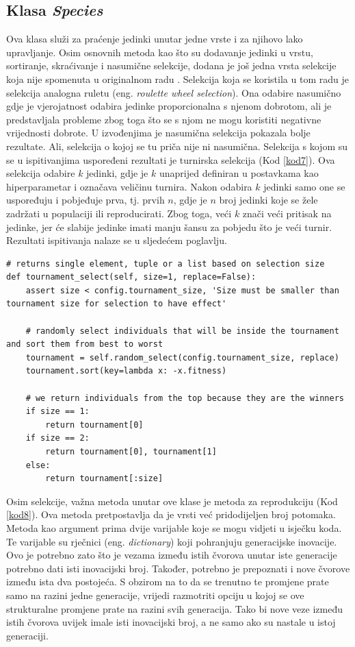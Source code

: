 \documentclass[times, utf8, diplomski, numeric]{fer}
\begin{document}
\subsection{Klasa \textit{Species}}
Ova klasa služi za praćenje jedinki unutar jedne vrste i za njihovo lako upravljanje. Osim osnovnih metoda kao što su dodavanje jedinki u vrstu, sortiranje, skraćivanje i nasumične selekcije, dodana je još jedna vrsta selekcije koja nije spomenuta u originalnom radu \citep{rad5}. Selekcija koja se koristila u tom radu je selekcija analogna ruletu (eng. \textit{roulette wheel selection}). Ona odabire nasumično gdje je vjerojatnost odabira jedinke proporcionalna s njenom dobrotom, ali je predstavljala probleme zbog toga što se s njom ne mogu koristiti negativne vrijednosti dobrote. U izvođenjima je nasumična selekcija pokazala bolje rezultate. Ali, selekcija o kojoj se tu priča nije ni nasumična. Selekcija s kojom su se u ispitivanjima uspoređeni rezultati je turnirska selekcija (Kod \ref{kod7}). Ova selekcija odabire $k$ jedinki, gdje je $k$ unaprijed definiran u postavkama kao hiperparametar i označava veličinu turnira. Nakon odabira $k$ jedinki samo one se uspoređuju i pobjeđuje prva, tj. prvih $n$, gdje je $n$ broj jedinki koje se žele zadržati u populaciji ili reproducirati. Zbog toga, veći $k$ znači veći pritisak na jedinke, jer će slabije jedinke imati manju šansu za pobjedu što je veći turnir. Rezultati ispitivanja nalaze se u sljedećem poglavlju.

\begin{lstlisting}[frame=single, label=kod7, caption=Izvorni tekst metode \textit{tournament\_select} u klasi \textit{Species}]
# returns single element, tuple or a list based on selection size
def tournament_select(self, size=1, replace=False):
	assert size < config.tournament_size, 'Size must be smaller than tournament size for selection to have effect'

	# randomly select individuals that will be inside the tournament and sort them from best to worst
	tournament = self.random_select(config.tournament_size, replace)
	tournament.sort(key=lambda x: -x.fitness)

	# we return individuals from the top because they are the winners
	if size == 1:
		return tournament[0]
	if size == 2:
		return tournament[0], tournament[1]
	else:
		return tournament[:size]
\end{lstlisting}

Osim selekcije, važna metoda unutar ove klase je metoda za reprodukciju (Kod \ref{kod8}). Ova metoda pretpostavlja da je vrsti već pridodijeljen broj potomaka. Metoda kao argument prima dvije varijable koje se mogu vidjeti u isječku koda. Te varijable su rječnici (eng. \textit{dictionary}) koji pohranjuju generacijske inovacije. Ovo je potrebno zato što je vezama između istih čvorova unutar iste generacije potrebno dati isti inovacijski broj. Također, potrebno je prepoznati i nove čvorove između ista dva postojeća. S obzirom na to da se trenutno te promjene prate samo na razini jedne generacije, vrijedi razmotriti opciju u kojoj se ove strukturalne promjene prate na razini svih generacija. Tako bi nove veze između istih čvorova uvijek imale isti inovacijski broj, a ne samo ako su nastale u istoj generaciji.
\end{document}
